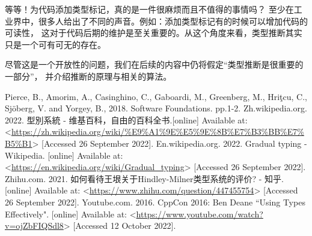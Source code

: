 \documentclass[../main.tex]{subfiles}
\begin{document}
  \indent 等等！为代码添加类型标记，真的是一件很麻烦而且不值得的事情吗？
  至少在工业界中，很多人给出了不同的声音。例如：添加类型标记有的时候可以增加代码的可读性，
  这对于代码后期的维护是至关重要的。从这个角度来看，类型推断其实只是一个可有可无的存在。 \cite{zh}

  \indent 尽管这是一个开放性的问题，我们在后续的内容中仍将假定“类型推断是很重要的一部分”，
  并介绍推断的原理与相关的算法。

  \begin{thebibliography}{5}
     Pierce, B., Amorim, A., Casinghino, C., Gaboardi, M., Greenberg, M., Hriţcu, C., Sjöberg, V. and Yorgey, B., 2018. Software Foundations. pp.1-2.
     Zh.wikipedia.org. 2022. 型別系統 - 维基百科，自由的百科全书.[online] Available at: <\url{https://zh.wikipedia.org/wiki/%E9%A1%9E%E5%9E%8B%E7%B3%BB%E7%B5%B1}> [Accessed 26 September 2022].
     En.wikipedia.org. 2022. Gradual typing - Wikipedia. [online] Available at: <\url{https://en.wikipedia.org/wiki/Gradual_typing}> [Accessed 26 September 2022].
     Zhihu.com. 2021. 如何看待王垠关于Hindley-Milner类型系统的评价? - 知乎. [online] Available at: <\url{https://www.zhihu.com/question/447455754}> [Accessed 26 September 2022].
     Youtube.com. 2016. CppCon 2016: Ben Deane “Using Types Effectively". [online] Available at: <\url{https://www.youtube.com/watch?v=ojZbFIQSdl8}> [Accessed 12 October 2022].
  \end{thebibliography}
\end{document}

